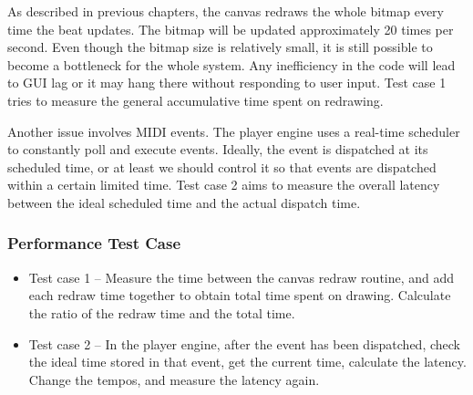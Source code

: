 As described in previous chapters, the canvas redraws the whole bitmap every time 
the beat updates. The bitmap will be updated approximately 20 times per second.
Even though the bitmap size is relatively small, it is still possible to become 
a bottleneck for the whole system. Any inefficiency in the code will lead to GUI 
lag or it may hang there without responding to user input. Test case 1 tries 
to measure the general accumulative time spent on redrawing. 

Another issue involves MIDI events. The player engine uses a real-time scheduler to  
constantly poll and execute events. Ideally, the event is dispatched at its 
scheduled time, or at least we should control it so that events are dispatched within 
a certain limited time. Test case 2 aims to measure the overall latency between 
the ideal scheduled time and the actual dispatch time. 
\subsubsection{Performance Test Case}
\begin{itemize}
  \item Test case 1 -- Measure the time between the canvas redraw routine, and 
        add each redraw time together to obtain total time spent on drawing. 
        Calculate the ratio of the redraw time and the total time.
  \item Test case 2 -- In the player engine, after the event has been dispatched, 
        check the ideal time stored in that event, get the current time, calculate 
        the latency. Change the tempos, and measure the latency again.
\end{itemize}
